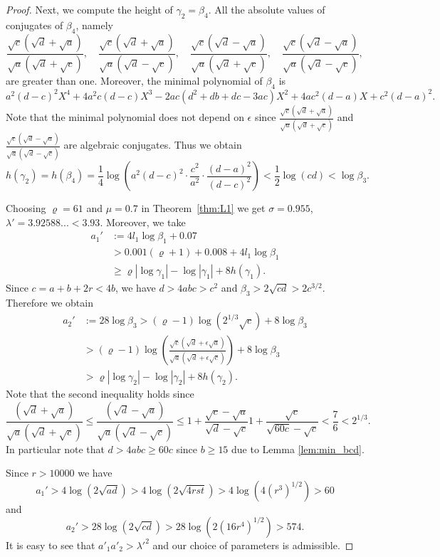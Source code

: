 \documentclass{amsart}
\theoremstyle{definition}
\begin{document}
\begin{proof}
Next, we compute the height of $\gamma_2=\beta_4$. All the absolute values of conjugates of $\beta_4$, namely 
$$
\frac{\sqrt{c}(\sqrt{d}+\sqrt{a})}{\sqrt{a}(\sqrt{d}+\sqrt{c})},\quad \frac{\sqrt{c}(\sqrt{d}+\sqrt{a})}{\sqrt{a}(\sqrt{d}-\sqrt{c})},\quad
\frac{\sqrt{c}(\sqrt{d}-\sqrt{a})}{\sqrt{a}(\sqrt{d}+\sqrt{c})},\quad \frac{\sqrt{c}(\sqrt{d}-\sqrt{a})}{\sqrt{a}(\sqrt{d}-\sqrt{c})}, 
$$
are greater than one. Moreover, the minimal polynomial of $\beta_4$ is 
$$
a^2(d-c)^2X^4+4a^2c(d-c)X^3-2ac(d^2+db+dc-3ac)X^2+4ac^2(d-a)X+c^2(d-a)^2.
$$
Note that the minimal polynomial does not depend on $\epsilon$ since $\frac{\sqrt{c}(\sqrt{d}+\sqrt{a})}{\sqrt{a}(\sqrt{d}+\sqrt{c})}$
and $\frac{\sqrt{c}(\sqrt{d}-\sqrt{a})}{\sqrt{a}(\sqrt{d}-\sqrt{c})}$ are algebraic conjugates. Thus we obtain
$$
h(\gamma_2)=h(\beta_4) =\frac{1}{4}\log\left(a^2(d-c)^2\cdot \frac{c^2}{a^2} \cdot \frac{(d-a)^2}{(d-c)^2}\right)< \frac{1}{2}\log(cd) <\log \beta_3. 
$$

Choosing $\varrho=61$ and $\mu = 0.7$ in Theorem~\ref{thm:L1} we get $\sigma = 0.955$, $\lambda' = 3.92588...<3.93$. Moreover, we take
\begin{align*}
 a_1'&:=4l_1 \log\beta_1 +0.07\\
 &>0.001(\varrho+1)  +0.008+ 4l_1 \log\beta_1 \\
& \geq  \varrho|\log\gamma_1| - \log|\gamma_1| + 8h(\gamma_1).
 \end{align*}
 Since $c=a+b+2r<4b$, we have $d>4abc>c^2$ and $\beta_3>2\sqrt{cd}>2c^{3/2}$. Therefore we obtain
 \begin{align*}
a_2'&:=28\log \beta_3> (\varrho-1)\log(2^{1/3}\sqrt{c}) + 8\log \beta_3\\
&>(\varrho-1)\log\left(\frac{\sqrt{c}(\sqrt{d}+\epsilon\sqrt{a})}{\sqrt{a}(\sqrt{d}+\epsilon\sqrt{c})}\right)+8\log \beta_3\\
&>\varrho|\log\gamma_2| - \log|\gamma_2| + 8h(\gamma_2).
 \end{align*} 
Note that the second inequality holds since
$$
\frac{(\sqrt{d}+\sqrt{a})}{\sqrt{a}(\sqrt{d}+\sqrt{c})}\leq \frac{(\sqrt{d}-\sqrt{a})}{\sqrt{a}(\sqrt{d}-\sqrt{c})} \leq 1+\frac{\sqrt{c}-\sqrt{a}}{\sqrt{d}-\sqrt{c}}
 1+\frac{\sqrt{c}}{\sqrt{60c}-\sqrt{c}}<\frac 76<2^{1/3}.
$$
In particular note that $d>4abc\geq 60c$ since $b\geq 15$ due to Lemma \ref{lem:min_bcd}.

Since $r>10000$ we have
$$a_1'>4\log(2\sqrt{ad})>4\log(2\sqrt{4rst})>4\log(4(r^3)^{1/2})>60$$ 
and 
 $$a_2'>28\log(2\sqrt{cd})>28\log(2(16r^4)^{1/2})>574. $$
It is easy to see that $a'_1a'_2>\lambda'^2$ and our choice of parameters is admissible.


\end{proof}
\end{document}
